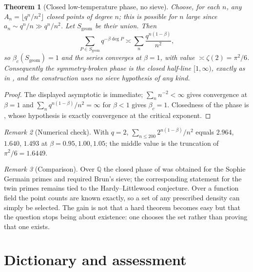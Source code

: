 \documentclass[11pt]{amsart}
\numberwithin{equation}{section}
\newtheorem{theorem}{Theorem}[section]
\theoremstyle{definition}
\theoremstyle{remark}
\newtheorem{remark}[theorem]{Remark}
\newcommand{\Q}{\mathbb{Q}}
\begin{document}
\begin{theorem}[Closed low-temperature phase, no sieve]\label{thm:sparse}
Choose, for each $n$, any $A_n=\lfloor q^n/n^2\rfloor$ closed points of degree $n$; this is
possible for $n$ large since $a_n\sim q^n/n\gg q^n/n^2$. Let $S_{\mathrm{geom}}$ be their
union. Then
\[
\sum_{P\in S_{\mathrm{geom}}}q^{-\beta\deg P}\asymp\sum_n\frac{q^{n(1-\beta)}}{n^2},
\]
so $\beta_c(S_{\mathrm{geom}})=1$ and the series \emph{converges at} $\beta=1$, with value
$\asymp\zeta(2)=\pi^2/6$. Consequently the symmetry-broken phase is the closed half-line
$[1,\infty)$, exactly as in \cite[Thm.~5.5]{Main}, and the construction uses no sieve
hypothesis of any kind.
\end{theorem}

\begin{proof}
The displayed asymptotic is immediate; $\sum_nn^{-2}<\infty$ gives convergence at $\beta=1$
and $\sum_nq^{n(1-\beta)}/n^2=\infty$ for $\beta<1$ gives $\beta_c=1$. Closedness of the
phase is \cite[Thm.~5.5]{Main}, whose hypothesis is exactly convergence at the critical
exponent.
\end{proof}

\begin{remark}[Numerical check]\label{rem:numsparse}
With $q=2$, $\sum_{n\le200}2^{n(1-\beta)}/n^2$ equals $2.964$, $1.640$, $1.493$ at
$\beta=0.95,1.00,1.05$; the middle value is the truncation of $\pi^2/6=1.6449$.
\end{remark}

\begin{remark}[Comparison]\label{rem:compare}
Over $\Q$ the closed phase of \cite[Thm.~5.5]{Main} was obtained for the Sophie Germain
primes and required Brun's sieve; the corresponding statement for the twin primes remains
tied to the Hardy--Littlewood conjecture. Over a function field the point counts are known
exactly, so a set of any prescribed density can simply be selected. The gain is not that a
hard theorem becomes easy but that the question stops being about existence: one chooses the
set rather than proving that one exists.
\end{remark}

\section{Dictionary and assessment}
\end{document}
